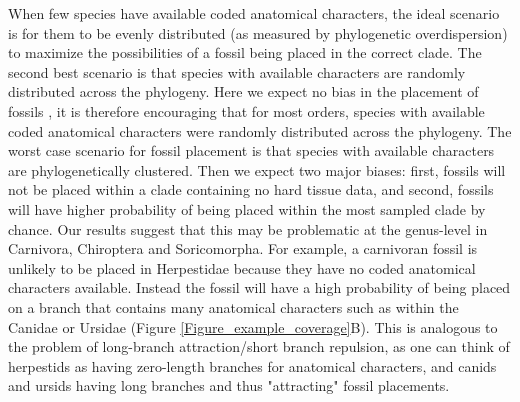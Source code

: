 \documentclass[12pt,letterpaper]{article}
\begin{document}
When few species have available coded anatomical characters, the ideal scenario is for them to be evenly distributed (as measured by phylogenetic overdispersion) to maximize the possibilities of a fossil being placed in the correct clade.
The second best scenario is that species with available characters are randomly distributed across the phylogeny. 
Here we expect no bias in the placement of fossils \cite{GuillermeCooper}, it is therefore encouraging that for most orders, species with available coded anatomical characters were randomly distributed across the phylogeny.
The worst case scenario for fossil placement is that species with available characters are phylogenetically clustered. 
Then we expect two major biases: first, fossils will not be placed within a clade containing no hard tissue data, and second, fossils will have higher probability of being placed within the most sampled clade by chance. %
Our results suggest that this may be problematic at the genus-level in Carnivora, Chiroptera and Soricomorpha. 
For example, a carnivoran fossil is unlikely to be placed in Herpestidae because they have no coded anatomical characters available.
Instead the fossil will have a high probability of being placed on a branch that contains many anatomical characters such as within the Canidae or Ursidae (Figure \ref{Figure_example_coverage}B). 
This is analogous to the problem of long-branch attraction/short branch repulsion, as one can think of herpestids as having zero-length branches for anatomical characters, and canids and ursids having long branches and thus "attracting" fossil placements.
\end{document}
